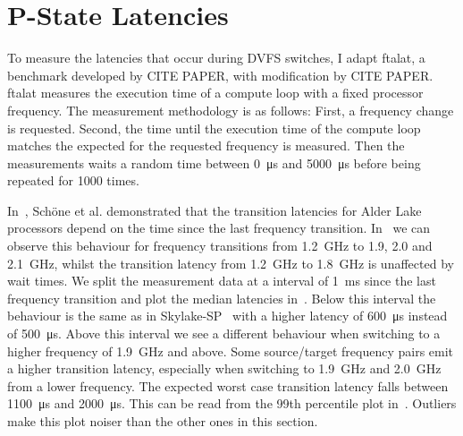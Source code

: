 \section{P-State Latencies}


To measure the latencies that occur during DVFS switches, I adapt ftalat, a benchmark developed by CITE PAPER, with modification by CITE PAPER.
ftalat measures the execution time of a compute loop with a fixed processor frequency.
The measurement methodology is as follows:
First, a frequency change is requested.
Second, the time until the execution time of the compute loop matches the expected for the requested frequency is measured.
Then the measurements waits a random time between \SI{0}{\us} and \SI{5000}{\us} before being repeated for \SI{1000}{} times.

In~\cite{Schoene_2024_Alder_Lake}, Schöne et al. demonstrated that the transition latencies for Alder Lake processors depend on the time since the last frequency transition.
In~ we can observe this behaviour for frequency transitions from \SI{1.2}{\GHz} to \SI{1.9}{}, \SI{2.0}{} and \SI{2.1}{\GHz}, whilst the transition latency from \SI{1.2}{\GHz} to \SI{1.8}{\GHz} is unaffected by wait times.
We split the measurement data at a interval of \SI{1}{\ms} since the last frequency transition and plot the median latencies in~.
Below this interval the behaviour is the same as in Skylake-SP~\cite{Schoene_2019_SKL} with a higher latency of \SI{600}{\us} instead of \SI{500}{\us}.
Above this interval we see a different behaviour when switching to a higher frequency of \SI{1.9}{\GHz} and above.
Some source/target frequency pairs emit a higher transition latency, especially when switching to \SI{1.9}{\GHz} and \SI{2.0}{\GHz} from a lower frequency.
The expected worst case transition latency falls between \SI{1100}{\us} and \SI{2000}{\us}.
This can be read from the 99th percentile plot in~.
Outliers make this plot noiser than the other ones in this section.

